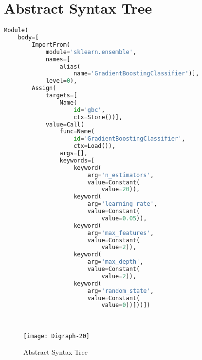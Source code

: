 \documentclass[german,bachelor]{swsLeipzig}
\begin{document}
\appendix
\chapter{Abstract Syntax Tree}
\begin{lstlisting}[language=Python, frame=single, basicstyle=\small]
Module(
    body=[
        ImportFrom(
            module='sklearn.ensemble',
            names=[
                alias(
                    name='GradientBoostingClassifier')],
            level=0),
        Assign(
            targets=[
                Name(
                    id='gbc',
                    ctx=Store())],
            value=Call(
                func=Name(
                    id='GradientBoostingClassifier',
                    ctx=Load()),
                args=[],
                keywords=[
                    keyword(
                        arg='n_estimators',
                        value=Constant(
                            value=20)),
                    keyword(
                        arg='learning_rate',
                        value=Constant(
                            value=0.05)),
                    keyword(
                        arg='max_features',
                        value=Constant(
                            value=2)),
                    keyword(
                        arg='max_depth',
                        value=Constant(
                            value=2)),
                    keyword(
                        arg='random_state',
                        value=Constant(
                            value=0))]))])
\end{lstlisting}
\


\begin{figure}[h]
 \centering
 \texttt{[image: Digraph-20]}
 \caption{Abstract Syntax Tree}
 \label{fig:asdt}
\end{figure}

\end{document}
